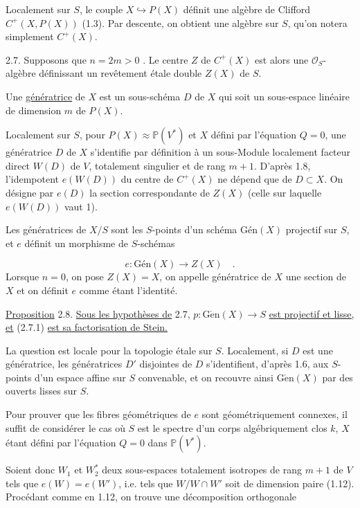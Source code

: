 Localement sur $S$, le couple $X \hookrightarrow P(X)$ définit une algèbre de Clifford $C^+(X, P(X))$ (1.3). Par descente, on obtient une algèbre sur $S$, qu'on notera simplement $C^+(X)$.

2.7. Supposons que $n = 2m > 0$ . Le centre $Z$ de $C^+(X)$ est alors une $\mathcal{O}_S$-algèbre définissant un revêtement étale double $Z(X)$ de $S$.

Une \underline{génératrice} de $X$ est un sous-schéma $D$ de $X$ qui soit un sous-espace linéaire de dimension $m$ de $P(X)$.

Localement sur $S$, pour $P(X) \approx \mathbb{P}(V^*)$ et $X$ défini par l'équation $Q = 0$, une génératrice $D$ de $X$ s'identifie par définition à un sous-Module localement facteur direct $W(D)$ de $V$, totalement singulier et de rang $m + 1$. D'après 1.8, l'idempotent $e(W(D))$ du centre de $C^+(X)$ ne dépend que de $D \subset X$. On désigne par $e(D)$ la section correspondante de $Z(X)$ (celle sur laquelle $e(W(D))$ vaut 1).

Les génératrices de $X/S$ sont les $S$-points d'un schéma $\mbox{Gén}(X)$ projectif sur $S$, et $e$ définit un morphisme de $S$-schémas

\begin{equation}\tag{2.7.1}
e : \mbox{Gén}(X) \longrightarrow Z(X) \quad .
\end{equation}
Lorsque $n = 0$, on pose $Z(X) = X$, on appelle génératrice de $X$ une section de $X$ et on définit $e$ comme étant l'identité.



\underline{Proposition} 2.8. \underline{Sous les hypothèses de} 2.7, $p : \mathrm{G\acute{e}n}(X) \longrightarrow S$ \underline{est projectif et lisse, et} (2.7.1) \underline{est sa factorisation de Stein.}

La question est locale pour la topologie étale sur $S$. Localement, si $D$ est une génératrice, les génératrices $D'$ disjointes de $D$ s'identifient, d'après 1.6, aux $S$-points d'un espace affine sur $S$ convenable, et on recouvre ainsi $\mathrm{G\acute{e}n}(X)$ par des ouverts lisses sur $S$.

Pour prouver que les fibres géométriques de $e$ sont géométriquement connexes, il suffit de considérer le cas où $S$ est le spectre d'un corps algébriquement clos $k$, $X$ étant défini par l'équation $Q = 0$ dans $\mathbb{P}(V^*)$.

Soient donc $W_1$ et $W^*_2$ deux sous-espaces totalement isotropes de rang $m + 1$ de $V$ tels que $e(W) = e(W')$, i.e. tels que $W/W \cap W'$ soit de dimension paire (1.12). Procédant comme en 1.12, on trouve une décomposition orthogonale

